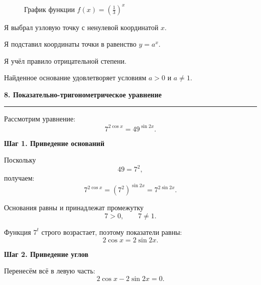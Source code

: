 \documentclass[a4paper,12pt]{article}
\newcommand{\topic}[1]{%
  \par\bigskip
  {\Large\bfseries\color{darkaccent}#1\par}
  \vspace{0.2em}
  {\color{accent}\rule{\linewidth}{0.7pt}}
  \vspace{0.55em}
}
\newcommand{\subtopic}[1]{%
  \par\medskip
  {\large\bfseries\color{darkaccent}#1\par}
  \vspace{0.2em}
}
\begin{document}
\begin{figure}[htbp]
  \centering
  \caption{График функции \(f(x)=\left(\frac13\right)^x\)}
\end{figure}

\begin{checklist}
  \item Я выбрал узловую точку с ненулевой координатой \(x\).
  \item Я подставил координаты точки в равенство \(y=a^x\).
  \item Я учёл правило отрицательной степени.
  \item Найденное основание удовлетворяет условиям \(a>0\) и \(a\ne1\).
\end{checklist}

\topic{8. Показательно-тригонометрическое уравнение}

Рассмотрим уравнение:
\[
7^{2\cos x}=49^{\sin 2x}.
\]

\subtopic{Шаг 1. Приведение оснований}

Поскольку
\[
49=7^2,
\]
получаем:
\[
7^{2\cos x}
=
\left(7^2\right)^{\sin 2x}
=
7^{2\sin 2x}.
\]

Основания равны и принадлежат промежутку
\[
7>0,\qquad 7\ne1.
\]

Функция \(7^t\) строго возрастает, поэтому показатели равны:
\[
2\cos x=2\sin 2x.
\]

\subtopic{Шаг 2. Приведение углов}

Перенесём всё в левую часть:
\[
2\cos x-2\sin 2x=0.
\]
\end{document}
